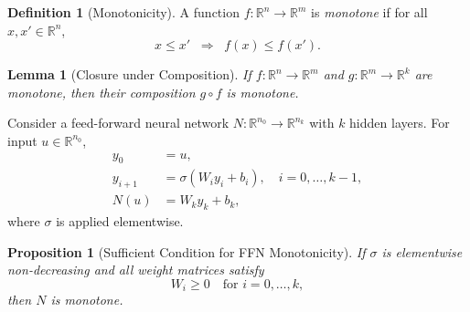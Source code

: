 \documentclass{article}
\theoremstyle{plain}
\newtheorem{proposition}[theorem]{Proposition}
\newtheorem{lemma}[theorem]{Lemma}
\theoremstyle{definition}
\newtheorem{definition}[theorem]{Definition}
\theoremstyle{remark}
\begin{document}
\begin{definition}[Monotonicity]
A function $f : \mathbb{R}^n \to \mathbb{R}^m$ is \emph{monotone} if for all $x,x' \in \mathbb{R}^n$,
\[
x \le x' \;\; \Rightarrow \;\; f(x) \le f(x').
\]
\end{definition}



\begin{lemma}[Closure under Composition]
\label{lem:mono_comp}
If $f : \mathbb{R}^n \to \mathbb{R}^m$ and $g : \mathbb{R}^m \to \mathbb{R}^k$ are monotone, then their composition $g \circ f$ is monotone.
\end{lemma}


Consider a feed-forward neural network $N : \mathbb{R}^{n_0} \to \mathbb{R}^{n_k}$ with $k$ hidden layers. For input $u \in \mathbb{R}^{n_0}$,
\begin{align*}
y_0 &= u, \\
y_{i+1} &= \sigma(W_i y_i + b_i), \quad i = 0,\ldots,k-1, \\
N(u) &= W_k y_k + b_k,
\end{align*}
where $\sigma$ is applied elementwise.

\begin{proposition}[Sufficient Condition for FFN Monotonicity]
\label{prop:ffn_mono}
If $\sigma$ is elementwise non-decreasing and all weight matrices satisfy
\[
W_i \ge 0 \quad \text{for } i = 0,\ldots,k,
\]
then $N$ is monotone.
\end{proposition}


\end{document}
